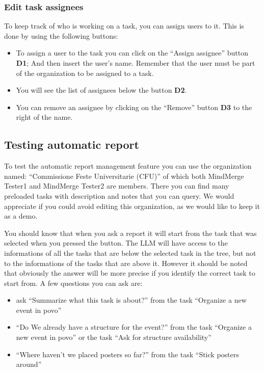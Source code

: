\documentclass{article}
\begin{document}
\subsubsection{Edit task assignees}

To keep track of who is working on a task, you can assign users to it.
This is done by using the following buttons:
\begin{itemize}
  \item To assign a user to the task you can click on the ``Assign assignee'' button \textbf{D1}; And then insert the user's name.
  Remember that the user must be part of the organization to be assigned to a task.
  \item You will see the list of assignees below the button \textbf{D2}.
  \item You can remove an assignee by clicking on the ``Remove'' button \textbf{D3} to the right of the name.

\end{itemize}
\subsection{Testing automatic report}

To test the automatic report management feature you can use the organization named: ``Commissione Feste Universitarie (CFU)''
of which both MindMerge Tester1 and MindMerge Tester2 are members.
There you can find many preloaded tasks with description and notes that you can query.
We would appreciate if you could avoid editing this organization, as we would like to keep it as a demo.


You should know that when you ask a report it will start from the task that was selected when you pressed the button.
The LLM will have access to the informations of all the tasks that are below the selected task in the tree, but not to the informations of the tasks that are above it.
\newline
However it should be noted that obviously the answer will be more precise if you identify the correct task to start from.
\newline
A few questions you can ask are:
\begin{itemize}
  \item ask ``Summarize what this task is about?'' from the task ``Organize a new event in povo''
  \item ``Do We already have a structure for the event?'' from the task ``Organize a new event in povo'' or the task ``Ask for structure availability''
  \item ``Where haven't we placed posters so far?'' from the task ``Stick posters around''
\end{itemize}
\end{document}
